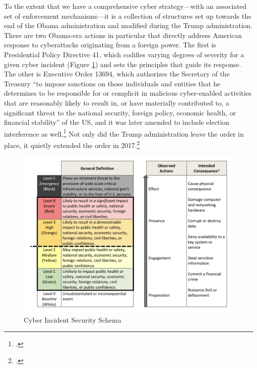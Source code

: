 \documentclass{memoir}
\begin{document}
\begin{refsegment}
To the extent that we have a comprehensive cyber strategy---with an associated set of enforcement mechanisms---it is a collection of structures set up towards the end of the Obama administration and modified during the Trump administration. There are two Obama-era actions in particular that directly address American response to cyberattacks originating from a foreign power. The first is Presidential Policy Directive 41, which codifies varying degrees of severity for a given cyber incident (Figure \ref{severity-schema}) and sets the principles that guide its response. The other is Executive Order 13694, which authorizes the Secretary of the Treasury ``to impose sanctions on those individuals and entities that he determines to be responsible for or complicit in malicious cyber-enabled activities that are reasonably likely to result in, or have materially contributed to, a significant threat to the national security, foreign policy, economic health, or financial stability'' of the US, and it was later amended to include election interference as well.\footcite{daniel_our_2015} Not only did the Trump administration leave the order in place, it quietly extended the order in 2017.\footcite{uchill_white_2017}

\begin{figure}
\centering
\includegraphics[scale=0.53]{severity-schema.png}
\caption{Cyber Incident Security Schema}
\label{severity-schema}
\end{figure}


\end{refsegment}
\end{document}
